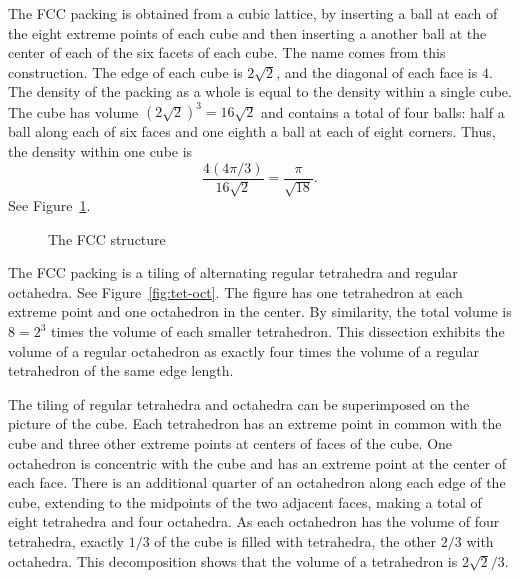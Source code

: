 The FCC packing is  obtained from a cubic
lattice, by inserting a ball at each of the eight extreme points of
each cube and then inserting a another ball at the center of each
of the six facets of each cube.  The name  comes from this
construction.  The edge of each cube is $2\sqrt2$, and the diagonal of
each face is $4$.  
  The density of the packing as a whole 
is equal to the density within a single cube.  The cube has volume
$(2\sqrt2)^3 = 16\sqrt2$  and contains a total of four balls: half a
ball along each of six faces and one eighth a ball at each of eight
corners.  Thus, the density within one cube is
   \begin{displaymath}
   \frac{   4 (4\pi/3)}{16\sqrt2} = \frac{\pi}{\sqrt{18}}.
   \end{displaymath}
See Figure~\ref{fig:fcc-cube}.

\begin{figure}[htb]
  \centering
  \caption{The FCC structure}
  \label{fig:fcc-cube}
\end{figure}


The FCC packing is a tiling of alternating regular tetrahedra and
regular octahedra.  See Figure~\ref{fig:tet-oct}.  The figure has one
tetrahedron at each extreme point and one octahedron in the center. By
similarity, the total volume is $8 = 2^3$ times the volume of each
smaller tetrahedron. This dissection exhibits the volume of a regular
octahedron as exactly four times the volume of a regular tetrahedron
of the same edge length.

The tiling of regular tetrahedra and octahedra can be
superimposed on the picture of the cube.  Each tetrahedron has an extreme point
in common with the cube and three other extreme points at centers of faces
of the cube.   One octahedron is concentric with the cube and has an extreme
point at the center of each face.  There is an
additional quarter of an octahedron along each edge of the cube, extending to the
midpoints of the two adjacent faces, making a total of eight
tetrahedra and four octahedra.  As each octahedron has the volume of
four tetrahedra, exactly $1/3$ of the cube is filled with tetrahedra,
the other $2/3$ with octahedra.  This decomposition shows that the
volume of a tetrahedron is $2\sqrt2/3$.

